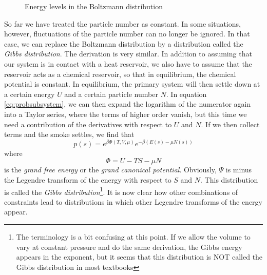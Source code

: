 \documentclass[a4paper, draft]{article}
\theoremstyle{own}
\theoremstyle{remark}
\begin{document}
\begin{figure}[ht]
	\begin{center}
	\end{center}
	\caption{Energy levels in the Boltzmann distribution}
	\label{fig:BoltzmannDistributionEnergies}
\end{figure}



So far we have treated the particle number as constant. In some situations, however, fluctuations of the particle number can no longer be ignored. In that case, we can replace the Boltzmann distribution by a distribution called the {\em Gibbs distribution}. The derivation is very similar. In addition to assuming that our system is in contact with a heat reservoir, we also have to assume that the reservoir acts as a chemical reservoir, so that in equilibrium, the chemical potential is constant. In equilibrium, the primary system will then settle down at a certain energy $U$ and a certain particle number $N$. In equation \ref{eq:probsubsystem}, we can then expand the logarithm of the numerator again into a Taylor series, where the terms of higher order vanish, but this time we need a contribution of the derivatives with respect to $U$ and $N$. If we then collect terms and the smoke settles, we find that 
$$
p(s) = e^{\beta \Phi(T,V,\mu)} e^{-\beta(E(s) - \mu N(s))}
$$
where 
$$
\Phi = U - TS - \mu N
$$
is the {\em grand free energy} or the {\em grand canonical potential}. Obviously, $\Psi$ is minus the Legendre transform of the energy with respect to $S$ and $N$. This distribution is called the 
{\em Gibbs distribution}\footnote{The terminology is a bit confusing at this point. If we allow the volume to vary at constant pressure and do the same derivation, the Gibbs energy appears in the exponent, but it seems that this distribution is NOT called the Gibbs distribution in most textbooks}. It is now clear how other combinations of constraints lead to distributions in which other Legendre transforms of the energy appear. 
\end{document}
